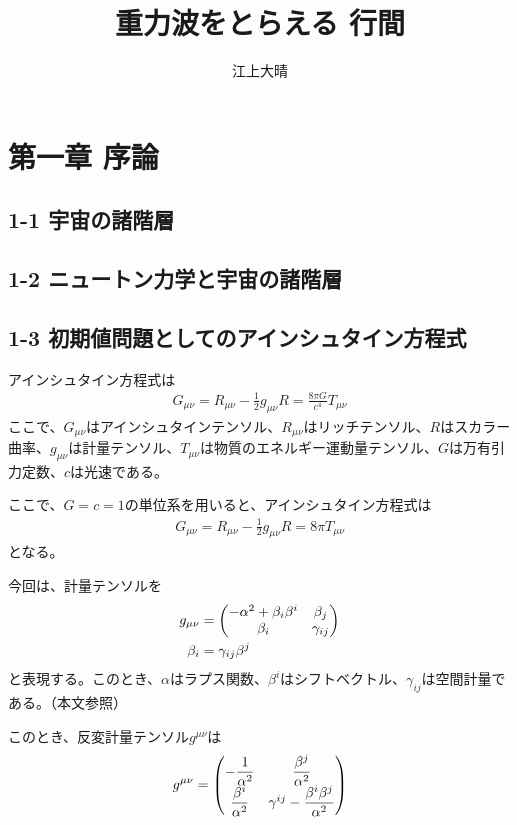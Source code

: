 \documentclass[autodetect-engine,dvi=dvipdfmx,ja=standard, 10pt, a4paper]{bxjsarticle}
\title{重力波をとらえる 行間}
\author{江上大晴}
\begin{document}
\maketitle

\section*{第一章 序論}
\subsection*{1-1 宇宙の諸階層}
\subsection*{1-2 ニュートン力学と宇宙の諸階層}
\subsection*{1-3 初期値問題としてのアインシュタイン方程式}
アインシュタイン方程式は
\begin{align}
	G_{\mu\nu} = R_{\mu\nu} -\frac{1}{2}g_{\mu\nu}R = \frac{8\pi G}{c^4}T_{\mu\nu}
\end{align}
ここで、$G_{\mu\nu}$はアインシュタインテンソル、$R_{\mu\nu}$はリッチテンソル、$R$はスカラー曲率、$g_{\mu\nu}$は計量テンソル、$T_{\mu\nu}$は物質のエネルギー運動量テンソル、$G$は万有引力定数、$c$は光速である。

ここで、$G=c=1$の単位系を用いると、アインシュタイン方程式は
\begin{align}
	G_{\mu\nu} = R_{\mu\nu} -\frac{1}{2}g_{\mu\nu}R = 8\pi T_{\mu\nu}
\end{align}
となる。

今回は、計量テンソルを
\begin{align}
	g_{\mu\nu} &= \pmqty{ -\alpha^2 + \beta_i\beta^i & \beta_j\\ \beta_i & \gamma_{ij} }\\
	\beta_i &= \gamma_{ij}\beta^j
	\label{eq:metric}
\end{align}
と表現する。このとき、$\alpha$はラプス関数、$\beta^i$はシフトベクトル、$\gamma_{ij}$は空間計量である。（本文参照）

このとき、反変計量テンソル$g^{\mu\nu}$は
\begin{align}
	g^{\mu\nu} = \pmqty{ -\dfrac{1}{\alpha^2} & \dfrac{\beta^j}{\alpha^2} \\ \dfrac{\beta^i}{\alpha^2} & \gamma^{ij} - \dfrac{\beta^i\beta^j}{\alpha^2} }
	\label{eq:invmetric}
\end{align}
\end{document}
